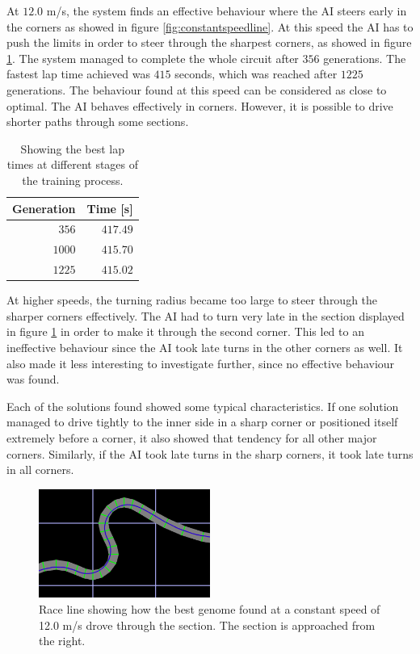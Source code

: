 \noindent
At $12.0$ m/s, the system finds an effective behaviour where the AI steers early in the corners as showed in figure \ref{fig:constantspeedline}. At this speed the AI has to push the limits in order to steer through the sharpest corners, as showed in figure \ref{fig:constantspeedsection}. The system managed to complete the whole circuit after $356$ generations. The fastest lap time achieved was $415$ seconds, which was reached after $1225$ generations. The behaviour found at this speed can be considered as close to optimal. The AI behaves effectively in corners. However, it is possible to drive shorter paths through some sections.

\begin{table}[h!] 
  \centering
  \begin{tabular}{rr}
    \toprule
    Generation & Time [s]\\
    \midrule
    $356$  & $417.49$ \\
    $1000$ & $415.70$ \\
    $1225$ & $415.02$ \\
    \bottomrule
  \end{tabular}
  \caption{Showing the best lap times at different stages of the training process.}
  \label{tab:constanttrackdata}
\end{table}

\noindent
At higher speeds, the turning radius became too large to steer through the sharper corners effectively. The AI had to turn very late in the section displayed in figure \ref{fig:constantspeedsection} in order to make it through the second corner. This led to an ineffective behaviour since the AI took late turns in the other corners as well. It also made it less interesting to investigate further, since no effective behaviour was found. 

Each of the solutions found showed some typical characteristics. If one solution managed to drive tightly to the inner side in a sharp corner or positioned itself extremely before a corner, it also showed that tendency for all other major corners. Similarly, if the AI took late turns in the sharp corners, it took late turns in all corners.

\begin{figure}
\includegraphics[width=0.5\textwidth]{report/images/constant_speed_section}
\centering
\caption{Race line showing how the best genome found at a constant speed of 12.0 m/s drove through the section. The section is approached from the right.}
\label{fig:constantspeedsection}
\vspace{-5pt}
\end{figure}


